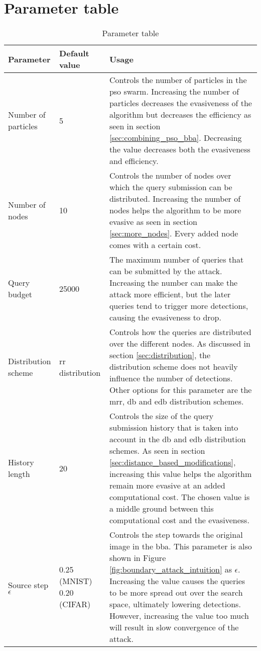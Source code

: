 \chapter{Parameter table}
\centering
\renewcommand*{\arraystretch}{1.7}
\begin{longtable}{p{3cm}p{2.5cm}p{7cm}}
\caption{Parameter table}
\label{tbl:parameter_table}\\
\toprule
Parameter &Default value &Usage \\ \midrule \endhead
\bottomrule\endfoot
Number of  particles	&5 &Controls the number of particles in the \gls{pso} swarm. Increasing the number of particles decreases the evasiveness of the algorithm but decreases the efficiency as seen in section \ref{sec:combining_pso_bba}. Decreasing the value decreases both the evasiveness and efficiency.\\
Number of nodes &10 &Controls the number of nodes over which the query submission can be distributed. Increasing the number of nodes helps the algorithm to be more evasive as seen in section \ref{sec:more_nodes}. Every added node comes with a certain cost.\\
Query budget &25000 &The maximum number of queries that can be submitted by the attack. Increasing the number can make the attack more efficient, but the later queries tend to trigger more detections, causing the evasiveness to drop.\\
Distribution scheme &\gls{rr} distribution &Controls how the queries are distributed over the different nodes. As discussed in section \ref{sec:distribution}, the distribution scheme does not heavily influence the number of detections. Other options for this parameter are the \gls{mrr}, \gls{db} and \gls{edb} distribution schemes.\\
History length	&20	&Controls the size of the query submission history that is taken into account in the \gls{db} and \gls{edb} distribution schemes. As seen in section \ref{sec:distance_based_modifications}, increasing this value helps the algorithm remain more evasive at an added computational cost. The chosen value is a middle ground between this computational cost and the evasiveness.\\
Source step $\epsilon$ &0.25 (MNIST) 0.20 (CIFAR) & Controls the step towards the original image in the \gls{bba}. This parameter is also shown in Figure \ref{fig:boundary_attack_intuition} as $\epsilon$. Increasing the value causes the queries to be more spread out over the search space, ultimately lowering detections. However, increasing the value too much will result in slow convergence of the attack.\\

\end{longtable}
